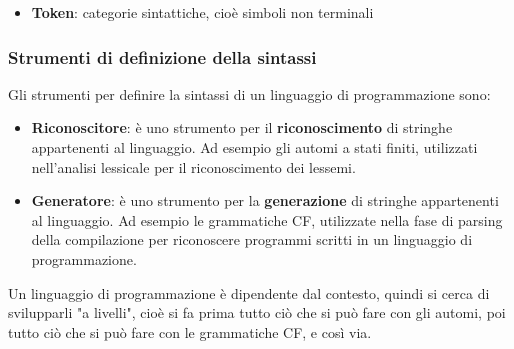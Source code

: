 \documentclass[a4paper]{article}
\begin{document}
\begin{itemize}
  \item \textbf{Token}: categorie sintattiche, cioè simboli non terminali

\end{itemize}

\subsubsection{Strumenti di definizione della sintassi}
Gli strumenti per definire la sintassi di un linguaggio di programmazione sono:
\begin{itemize}
  \item \textbf{Riconoscitore}: è uno strumento per il \textbf{riconoscimento} di
    stringhe appartenenti al linguaggio. Ad esempio gli automi a stati finiti, utilizzati
    nell'analisi lessicale per il riconoscimento dei lessemi.

  \item \textbf{Generatore}: è uno strumento per la \textbf{generazione} di stringhe
    appartenenti al linguaggio. Ad esempio le grammatiche CF, utilizzate nella fase
    di parsing della compilazione per riconoscere programmi scritti in un linguaggio
    di programmazione.
\end{itemize}

\begin{define}
  Un linguaggio di programmazione è dipendente dal contesto, quindi si cerca di svilupparli
  "a livelli", cioè si fa prima tutto ciò che si può fare con gli automi, poi tutto ciò
  che si può fare con le grammatiche CF, e così via.
\end{define}
\end{document}
